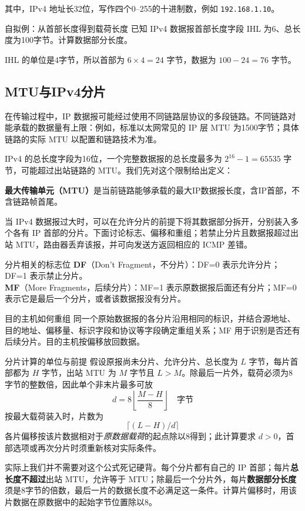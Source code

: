 其中，IPv4 地址长32位，写作四个0--255的十进制数，例如 \texttt{192.168.1.10}。

\begin{example}{自拟例：从首部长度得到载荷长度}
已知 IPv4 数据报首部长度字段 IHL 为6、总长度为100字节。计算数据部分长度。
\end{example}

\begin{solution}
IHL 的单位是4字节，所以首部为 $6\times4=24$ 字节，数据为 $100-24=76$ 字节。
\end{solution}

\subsection{MTU与IPv4分片}
在传输过程中，IP 数据报可能经过使用不同链路层协议的多段链路。不同链路对能承载的数据量有上限：例如，标准以太网常见的 IP 层 MTU 为1500字节；具体链路的实际 MTU 以配置和链路技术为准。

IPv4 的总长度字段为16位，一个完整数据报的总长度最多为 $2^{16}-1=65535$ 字节，可能超过出站链路的 MTU。我们先对这个限制给出定义：
\begin{definition}
\textbf{最大传输单元（MTU）}是当前链路能够承载的最大IP数据报长度，含IP首部，不含链路帧首尾。
\end{definition}

当 IPv4 数据报过大时，可以在允许分片的前提下将其数据部分拆开，分别装入多个各有 IP 首部的分片。下面讨论标志、偏移和重组；若禁止分片且数据报超过出站 MTU，路由器丢弃该报，并可向发送方返回相应的 ICMP 差错。

\begin{proposition}{分片相关的标志位}
\textbf{DF}（Don't Fragment，不分片）：DF=0 表示允许分片；DF=1 表示禁止分片。\\
\textbf{MF}（More Fragments，后续分片）：MF=1 表示原数据报后面还有分片；MF=0 表示它是最后一个分片，或者该数据报没有分片。
\end{proposition}

\begin{proposition}{目的主机如何重组}
同一个原始数据报的各分片沿用相同的标识，并结合源地址、目的地址、偏移量、标识字段和协议等字段确定重组关系；MF 用于识别是否还有后续分片。目的主机按偏移放回数据。
\end{proposition}

\begin{proposition}{分片计算的单位与前提}
假设原报尚未分片、允许分片、总长度为 $L$ 字节，每片首部都为 $H$ 字节，出站 MTU 为 $M$ 字节且 $L>M$。除最后一片外，载荷必须为8字节的整数倍，因此单个非末片最多可放
\[d=8\left\lfloor\frac{M-H}{8}\right\rfloor\quad\text{字节}\]
按最大载荷装入时，片数为 
\[\lceil(L-H)/d\rceil\]
各片偏移按该片数据相对于\emph{原数据载荷}的起点除以8得到；此计算要求 $d>0$，首部选项或再次分片时须重新核对实际条件。
\end{proposition}
\begin {remark}
实际上我们并不需要对这个公式死记硬背。每个分片都有自己的 IP 首部；每片\textbf{总长度不超过}出站 MTU，允许等于 MTU；除最后一个分片外，每片\textbf{数据部分长度}须是8字节的倍数，最后一片的数据长度不必满足这一条件。计算片偏移时，用该片数据在原数据中的起始字节位置除以8。
\end{remark}

